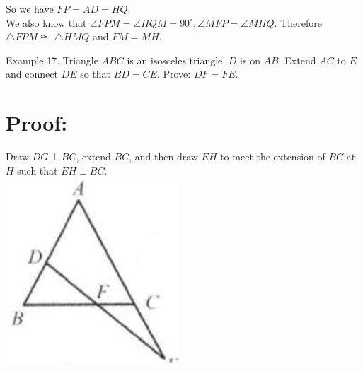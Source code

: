 \documentclass[10pt]{article}
\begin{document}
So we have \(F P=A D=H Q\).\\
We also know that \(\angle F P M=\angle H Q M=90^{\circ}, \angle M F P=\angle M H Q\). Therefore \(\triangle F P M \cong\) \(\triangle H M Q\) and \(F M=M H\).

Example 17. Triangle \(A B C\) is an isosceles triangle. \(D\) is on \(A B\). Extend \(A C\) to \(E\) and connect \(D E\) so that \(B D=C E\). Prove: \(D F=F E\).

\section*{Proof:}
Draw \(D G \perp B C\), extend \(B C\), and then draw \(E H\) to meet the extension of \(B C\) at \(H\) such that \(E H \perp B C\).\\
\includegraphics[max width=\textwidth, center]{2025_04_17_97bc1f7e44d93c271a88g-084(3)}
\end{document}
